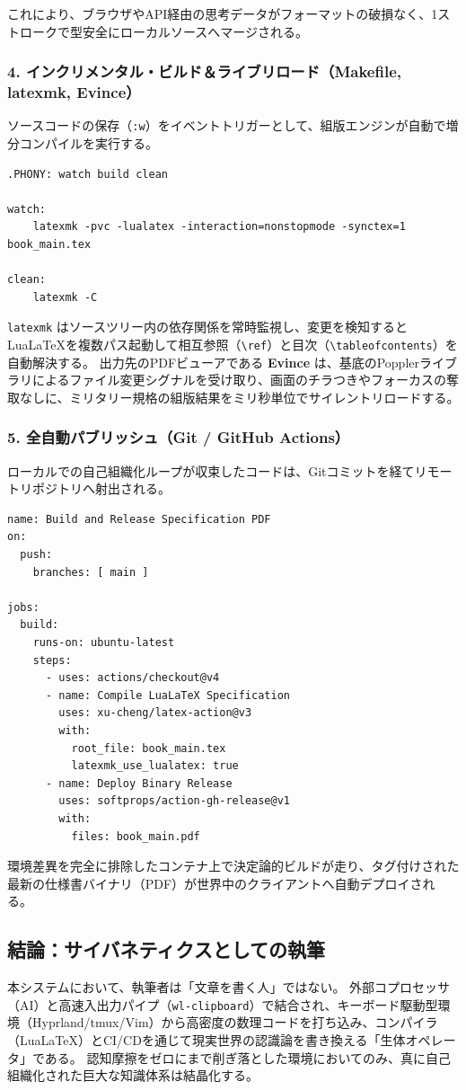 これにより、ブラウザやAPI経由の思考データがフォーマットの破損なく、1ストロークで型安全にローカルソースへマージされる。

\subsubsection{4. インクリメンタル・ビルド＆ライブリロード（Makefile, latexmk, Evince）}
ソースコードの保存（\texttt{:w}）をイベントトリガーとして、組版エンジンが自動で増分コンパイルを実行する。

\begin{verbatim}
.PHONY: watch build clean

watch:
	latexmk -pvc -lualatex -interaction=nonstopmode -synctex=1 book_main.tex

clean:
	latexmk -C
\end{verbatim}

\texttt{latexmk} はソースツリー内の依存関係を常時監視し、変更を検知するとLuaLaTeXを複数パス起動して相互参照（\texttt{\textbackslash ref}）と目次（\texttt{\textbackslash tableofcontents}）を自動解決する。
出力先のPDFビューアである \textbf{Evince} は、基底のPopplerライブラリによるファイル変更シグナルを受け取り、画面のチラつきやフォーカスの奪取なしに、ミリタリー規格の組版結果をミリ秒単位でサイレントリロードする。

\subsubsection{5. 全自動パブリッシュ（Git / GitHub Actions）}
ローカルでの自己組織化ループが収束したコードは、Gitコミットを経てリモートリポジトリへ射出される。

\begin{verbatim}
name: Build and Release Specification PDF
on:
  push:
    branches: [ main ]

jobs:
  build:
    runs-on: ubuntu-latest
    steps:
      - uses: actions/checkout@v4
      - name: Compile LuaLaTeX Specification
        uses: xu-cheng/latex-action@v3
        with:
          root_file: book_main.tex
          latexmk_use_lualatex: true
      - name: Deploy Binary Release
        uses: softprops/action-gh-release@v1
        with:
          files: book_main.pdf
\end{verbatim}

環境差異を完全に排除したコンテナ上で決定論的ビルドが走り、タグ付けされた最新の仕様書バイナリ（PDF）が世界中のクライアントへ自動デプロイされる。

\subsection{結論：サイバネティクスとしての執筆}
本システムにおいて、執筆者は「文章を書く人」ではない。
外部コプロセッサ（AI）と高速入出力パイプ（\texttt{wl-clipboard}）で結合され、キーボード駆動型環境（Hyprland/tmux/Vim）から高密度の数理コードを打ち込み、コンパイラ（LuaLaTeX）とCI/CDを通じて現実世界の認識論を書き換える「生体オペレータ」である。
認知摩擦をゼロにまで削ぎ落とした環境においてのみ、真に自己組織化された巨大な知識体系は結晶化する。
\backmatter

